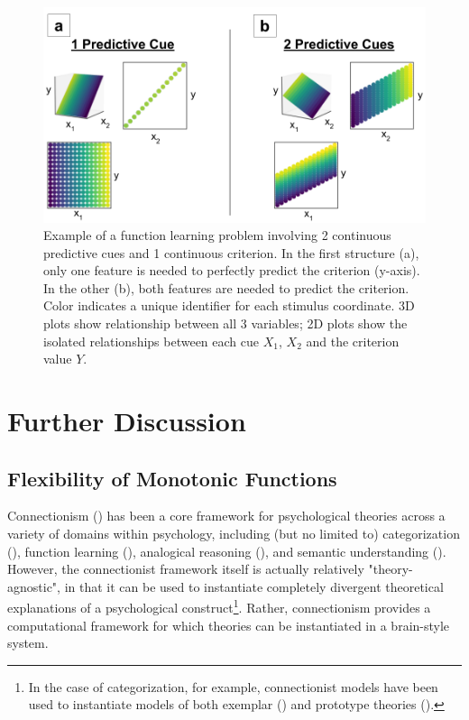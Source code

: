 \documentclass[12pt]{article}
\let\oldcite=\cite
\renewcommand{\cite}[1]{\textcolor[rgb]{0, .121, .388}{\oldcite{#1}}}
\begin{document}
\begin{figure}[H]
    \centering
    \includegraphics[scale=.4]{figures/filt-cond-func.png}
    \caption{Example of a function learning problem involving 2 continuous predictive cues and 1 continuous criterion. In the first structure (a), only one feature is needed to perfectly predict the criterion (y-axis). In the other (b), both features are needed to predict the criterion. Color indicates a unique identifier for each stimulus coordinate. 3D plots show relationship between all 3 variables; 2D plots show the isolated relationships between each cue $X_1$, $X_2$ and the criterion value $Y$.}
    \label{fig:filt-cond-func}
\end{figure} 


\section{Further Discussion}

\subsection{Flexibility of Monotonic Functions}\label{sigmoid_section}

Connectionism (\cite{rumelhart1986general}) has been a core framework for psychological theories across a variety of domains within psychology, including (but no limited to) categorization (\cite{kruschke1992alcove,kurtz2007divergent,gluck1988conditioning}), function learning (\cite{kalish2004population,delosh1997extrapolation}), analogical reasoning (\cite{tomlinson2006learning}), and semantic understanding (\cite{rogers2004semantic}). However, the connectionist framework itself is actually relatively "theory-agnostic", in that it can be used to instantiate completely divergent theoretical explanations of a psychological construct\footnote{In the case of categorization, for example, connectionist models have been used to instantiate models of both exemplar (\cite{kruschke1992alcove}) and prototype theories (\cite{johansen2002there}).}. Rather, connectionism provides a computational framework for which theories can be instantiated in a brain-style system.
\end{document}
